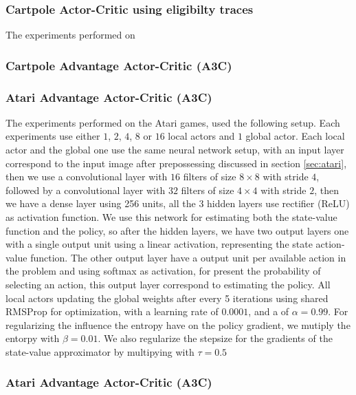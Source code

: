 \documentclass[11pt]{article}
\begin{document}
\subsubsection{Cartpole Actor-Critic using eligibilty traces}

The experiments performed on 


\subsubsection{Cartpole Advantage Actor-Critic (A3C)}


\subsubsection{Atari Advantage Actor-Critic (A3C)}

The experiments performed on the Atari games, used the following setup. Each experiments use either $1$, $2$, $4$, $8$ or $16$ local actors and $1$ global actor. Each local actor and the global one use the same neural network setup, with an input layer correspond to the input image after prepossessing discussed in section \ref{sec:atari}, then we use a convolutional layer with $16$ filters of size $8 \times 8$ with stride $4$, followed by a convolutional layer with $32$ filters of size $4 \times 4$ with stride $2$, then we have a dense layer using 256 units, all the 3 hidden layers use rectifier (ReLU) as activation function. We use this network for estimating both the state-value function and the policy, so after the hidden layers, we have two output layers one with a single output unit using a linear activation, representing the state action-value function. The other output layer have a output unit per available action in the problem and using softmax as activation, for present the probability of selecting an action, this output layer correspond to estimating the policy. All local actors updating the global weights after every 5 iterations using shared RMSProp for optimization, with a learning rate of $0.0001$, and a of $\alpha = 0.99$. For regularizing the influence the entropy have on the policy gradient, we mutiply the entorpy with $\beta = 0.01$. We also regularize the stepsize for the gradients of the state-value approximator by multipying with $\tau = 0.5$




\subsubsection{Atari Advantage Actor-Critic (A3C)}
\end{document}
